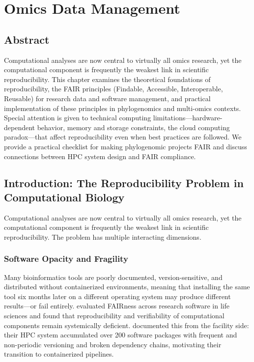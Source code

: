 \chapter{Omics Data Management}

\section*{Abstract}

Computational analyses are now central to virtually all omics research, yet the computational component is frequently the weakest link in scientific reproducibility. This chapter examines the theoretical foundations of reproducibility, the FAIR principles (Findable, Accessible, Interoperable, Reusable) for research data and software management, and practical implementation of these principles in phylogenomics and multi-omics contexts. Special attention is given to technical computing limitations---hardware-dependent behavior, memory and storage constraints, the cloud computing paradox---that affect reproducibility even when best practices are followed. We provide a practical checklist for making phylogenomic projects FAIR and discuss connections between HPC system design and FAIR compliance.

\section{Introduction: The Reproducibility Problem in Computational Biology}

Computational analyses are now central to virtually all omics research, yet the computational component is frequently the weakest link in scientific reproducibility. The problem has multiple interacting dimensions.

\subsection{Software Opacity and Fragility}

Many bioinformatics tools are poorly documented, version-sensitive, and distributed without containerized environments, meaning that installing the same tool six months later on a different operating system may produce different results---or fail entirely. \textcite{martindelico2024} evaluated FAIRness across research software in life sciences and found that reproducibility and verifiability of computational components remain systemically deficient. \textcite{zafeiropoulos2021} documented this from the facility side: their HPC system accumulated over 200 software packages with frequent and non-periodic versioning and broken dependency chains, motivating their transition to containerized pipelines.


